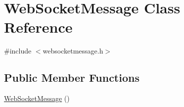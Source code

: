 \hypertarget{class_web_socket_message}{\section{Web\-Socket\-Message Class Reference}
\label{class_web_socket_message}
}


{\ttfamily \#include $<$websocketmessage.\-h$>$}

\subsection*{Public Member Functions}
\begin{DoxyCompactItemize}
\item 
\hypertarget{class_web_socket_message_a9ccef692ce81b78f9cabafb2ff0db849}{\hyperlink{class_web_socket_message_a9ccef692ce81b78f9cabafb2ff0db849}{Web\-Socket\-Message} ()}\label{class_web_socket_message_a9ccef692ce81b78f9cabafb2ff0db849}


\end{DoxyCompactItemize}
